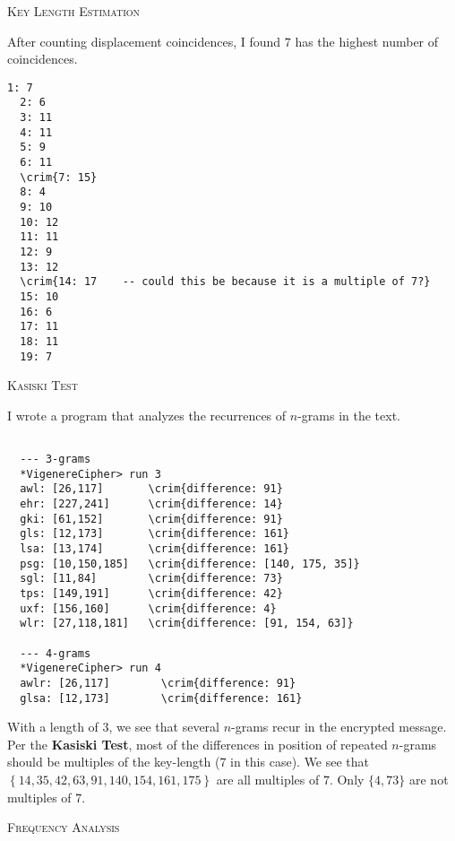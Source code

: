 \begin{Answer}
\begin{center}\textsc{Key Length Estimation}\end{center}
\bigskip
After counting displacement coincidences, I found $7$ has the highest number of coincidences.

\color{zaffre}
\begin{Verbatim}[commandchars=\\\{\}]
  1: 7
  2: 6
  3: 11
  4: 11
  5: 9
  6: 11
  \crim{7: 15}
  8: 4
  9: 10
  10: 12
  11: 11
  12: 9
  13: 12
  \crim{14: 17    -- could this be because it is a multiple of 7?}
  15: 10
  16: 6
  17: 11
  18: 11
  19: 7
\end{Verbatim}
\color{black}
\begin{center}\textsc{Kasiski Test}\end{center}

I wrote a program that analyzes the recurrences of $n$-grams in the text.
\noindent
\color{zaffre}
\begin{Verbatim}[commandchars=\\\{\}]

  --- 3-grams
  *VigenereCipher> run 3
  awl: [26,117]       \crim{difference: 91}
  ehr: [227,241]      \crim{difference: 14}
  gki: [61,152]       \crim{difference: 91}
  gls: [12,173]       \crim{difference: 161}
  lsa: [13,174]       \crim{difference: 161}
  psg: [10,150,185]   \crim{difference: [140, 175, 35]}
  sgl: [11,84]        \crim{difference: 73}
  tps: [149,191]      \crim{difference: 42}
  uxf: [156,160]      \crim{difference: 4}
  wlr: [27,118,181]   \crim{difference: [91, 154, 63]}

  --- 4-grams
  *VigenereCipher> run 4
  awlr: [26,117]        \crim{difference: 91}
  glsa: [12,173]        \crim{difference: 161}
\end{Verbatim}
\color{black}
\noindent
With a length of 3, we see that several $n$-grams recur in the encrypted message.
\newline
Per the \textbf{Kasiski Test}, most of the differences in position
of repeated $n$-grams should be multiples of the key-length ($7$ in this case).
We see that $\left\{14, 35, 42, 63, 91, 140, 154, 161, 175\right\}$ are all multiples of $7$.
Only $\{4, 73\}$ are not multiples of $7$.
\pagebreak
\begin{center}
\textsc{Frequency Analysis}
\end{center}


\end{Answer}
